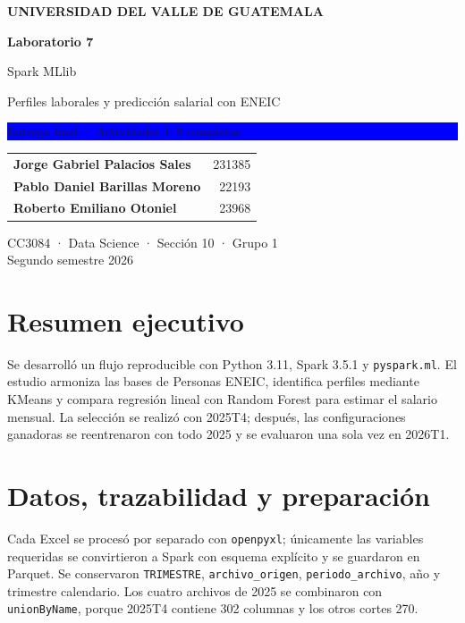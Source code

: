 \documentclass[11pt,letterpaper]{article}
\begin{document}
\begin{titlepage}
\pagecolor{Navy}
\color{white}
\vspace*{1.0cm}
{\small\bfseries UNIVERSIDAD DEL VALLE DE GUATEMALA}\par
\vspace{2.0cm}
{\Huge\bfseries Laboratorio 7}\par
\vspace{0.2cm}
{\fontsize{30}{34}\selectfont Spark MLlib}\par
\vspace{0.7cm}
{\Large Perfiles laborales y predicción salarial con ENEIC}\par
\vspace{1.2cm}
\colorbox{Blue}{\parbox{0.88\textwidth}{\color{white}\centering\large Entrega final · Actividades 1--8 completas}}
\vfill
\begin{tabularx}{\textwidth}{X r}
\textbf{Jorge Gabriel Palacios Sales} & 231385\\[6pt]
\textbf{Pablo Daniel Barillas Moreno} & 22193\\[6pt]
\textbf{Roberto Emiliano Otoniel} & 23968\\
\end{tabularx}
\vspace{1cm}
CC3084 · Data Science · Sección 10 · Grupo 1\\
Segundo semestre 2026
\vspace*{0.7cm}
\end{titlepage}
\nopagecolor
\color{Navy}

\section{Resumen ejecutivo}

Se desarrolló un flujo reproducible con Python 3.11, Spark 3.5.1 y
\texttt{pyspark.ml}. El estudio armoniza las bases de Personas ENEIC,
identifica perfiles mediante KMeans y compara regresión lineal con Random
Forest para estimar el salario mensual. La selección se realizó con 2025T4;
después, las configuraciones ganadoras se reentrenaron con todo 2025 y se
evaluaron una sola vez en 2026T1.



\section{Datos, trazabilidad y preparación}

Cada Excel se procesó por separado con \texttt{openpyxl}; únicamente las
variables requeridas se convirtieron a Spark con esquema explícito y se
guardaron en Parquet. Se conservaron \texttt{TRIMESTRE},
\texttt{archivo\_origen}, \texttt{periodo\_archivo}, año y trimestre
calendario. Los cuatro archivos de 2025 se combinaron con
\texttt{unionByName}, porque 2025T4 contiene 302 columnas y los otros cortes
270.
\end{document}
